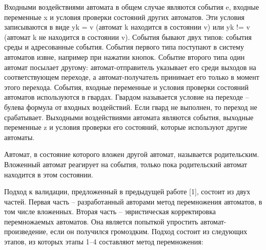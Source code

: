 \documentclass[12pt]{article}
\begin{document}
Входными воздействиями автомата в общем случае являются события e, входные переменные x и условия проверки состояний других автоматов. Эти условия записываются в виде yk = v (автомат k находится в состоянии v) или yk != v (автомат k не находится в состоянии v).
События бывают двух типов: события среды и адресованные события. События первого типа поступают в систему автоматов извне, например при нажатии кнопок. Событие второго типа один автомат посылает другому: автомат-отправитель указывает его среди выходов на соответствующем переходе, а автомат-получатель принимает его только в момент этого перехода.
События, входные переменные и условия проверки состояний автоматов используются в гвардах. Гвардом называется условие на переходе – булева формула от входных воздействий. Если гвард не выполнен, то переход не срабатывает.
Выходными воздействиями автомата являются события, выходные переменные z и условия проверки его состояний, которые используют другие автоматы.

Автомат, в состояние которого вложен другой автомат, называется родительским. Вложенный автомат реагирует на события, только пока родительский автомат находится в этом состоянии.

Подход к валидации, предложенный в предыдущей работе [1], состоит из двух частей. Первая часть – разработанный авторами метод перемножения автоматов, в том числе вложенных. Вторая часть – эвристическая корректировка перемножаемых автоматов. Она является попыткой упростить автомат-произведение, если он получился громоздким.
Подход состоит из следующих этапов, из которых этапы 1–4 составляют метод перемножения:
\end{document}
